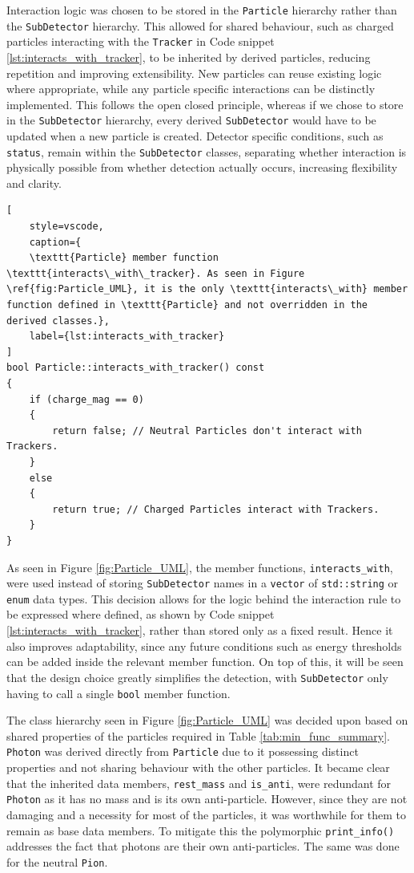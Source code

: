\documentclass{article}
\begin{document}
Interaction logic was chosen to be stored in the \texttt{Particle} hierarchy rather than the \texttt{SubDetector} hierarchy.
This allowed for shared behaviour, such as charged particles interacting with the \texttt{Tracker} in Code snippet \ref{lst:interacts_with_tracker}, to be inherited by derived particles, reducing repetition and improving extensibility.
New particles can reuse existing logic where appropriate, while any particle specific interactions can be distinctly implemented.
This follows the open closed principle, whereas if we chose to store in the \texttt{SubDetector} hierarchy, every derived \texttt{SubDetector} would have to be updated when a new particle is created.
Detector specific conditions, such as \texttt{status}, remain within the \texttt{SubDetector} classes, separating whether interaction is physically possible from whether detection actually occurs, increasing flexibility and clarity.
\begin{lstlisting}[
    style=vscode, 
    caption={
    \texttt{Particle} member function \texttt{interacts\_with\_tracker}. As seen in Figure \ref{fig:Particle_UML}, it is the only \texttt{interacts\_with} member function defined in \texttt{Particle} and not overridden in the derived classes.},
    label={lst:interacts_with_tracker}
]
bool Particle::interacts_with_tracker() const
{
    if (charge_mag == 0)
    {
        return false; // Neutral Particles don't interact with Trackers.
    }
    else
    {
        return true; // Charged Particles interact with Trackers.
    }
}
\end{lstlisting}

As seen in Figure \ref{fig:Particle_UML}, the member functions, \texttt{interacts\_with}, were used instead of storing \texttt{SubDetector} names in a \texttt{vector} of \texttt{std::string} or \texttt{enum} data types.
This decision allows for the logic behind the interaction rule to be expressed where defined, as shown by Code snippet \ref{lst:interacts_with_tracker}, rather than stored only as a fixed result. 
Hence it also improves adaptability, since any future conditions such as energy thresholds can be added inside the relevant member function.
On top of this, it will be seen that the design choice greatly simplifies the detection, with \texttt{SubDetector} only having to call a single \texttt{bool} member function. 

The class hierarchy seen in Figure \ref{fig:Particle_UML} was decided upon based on shared properties of the particles required in Table \ref{tab:min_func_summary}.
\texttt{Photon} was derived directly from \texttt{Particle} due to it possessing distinct properties and not sharing behaviour with the other particles.
It became clear that the inherited data members, \texttt{rest\_mass} and \texttt{is\_anti}, were redundant for \texttt{Photon} as it has no mass and is its own anti-particle. However, since they are not damaging and a necessity for most of the particles, it was worthwhile for them to remain as base data members.
To mitigate this the polymorphic \texttt{print\_info()} addresses the fact that photons are their own anti-particles.
The same was done for the neutral \texttt{Pion}.
\end{document}
